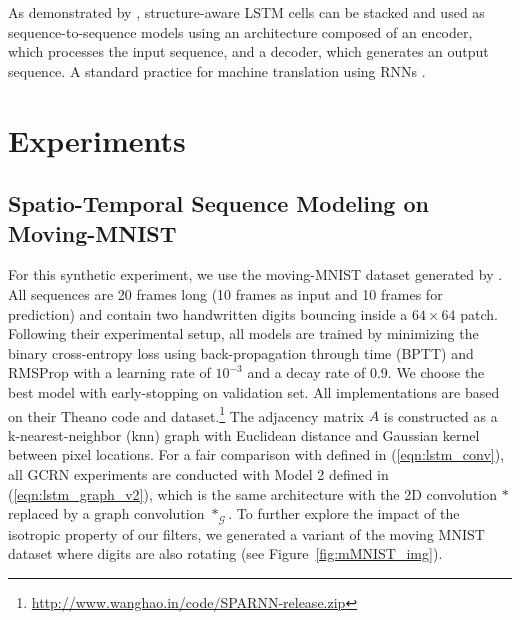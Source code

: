 \documentclass{article}
\newcommand{\G}{\mathcal{G}}
\newcommand{\figref}[1]{Figure~\ref{fig:#1}}
\newcommand{\eqnref}[1]{(\ref{eqn:#1})}
\begin{document}
As demonstrated by \citet{convlstm}, structure-aware LSTM cells can be stacked
and used as sequence-to-sequence models using an architecture composed of an
encoder, which processes the input sequence, and a decoder, which generates an
output sequence. A standard practice for machine translation using RNNs
\citep{gru, seq2seq}.

\section{Experiments} \label{sec:experiments}

\subsection{Spatio-Temporal Sequence Modeling on Moving-MNIST}

For this synthetic experiment, we use the moving-MNIST dataset generated by
\citet{convlstm}. All sequences are 20 frames long (10 frames as input and 10
frames for prediction) and contain two handwritten digits bouncing inside a $64
\times 64$ patch. Following their experimental setup, all models are trained by
minimizing the binary cross-entropy loss using back-propagation through time
(BPTT) and RMSProp with a learning rate of $10^{-3}$ and a decay rate of 0.9.
We choose the best model with early-stopping on validation set. All
implementations are based on their Theano code and
dataset.\footnote{\url{http://www.wanghao.in/code/SPARNN-release.zip}} The
adjacency matrix $A$ is constructed as a k-nearest-neighbor (knn) graph with
Euclidean distance and Gaussian kernel between pixel locations. For a fair
comparison with \citet{convlstm} defined in \eqnref{lstm_conv}, all GCRN
experiments are conducted with Model 2 defined in \eqnref{lstm_graph_v2}, which
is the same architecture with the 2D convolution $\ast$ replaced by a graph
convolution $\ast_\G$. To further explore the impact of the isotropic property
of our filters, we generated a variant of the moving MNIST dataset where digits
are also rotating (see \figref{mMNIST_img}).
\end{document}
